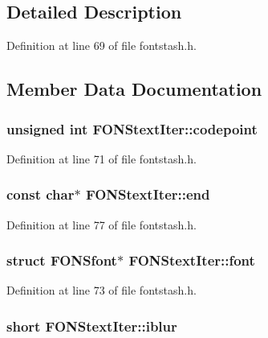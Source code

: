 \subsection{Detailed Description}


Definition at line 69 of file fontstash.\+h.



\subsection{Member Data Documentation}
\hypertarget{struct_f_o_n_stext_iter_aa5f74c11fa7741d0050e5a1840169ffd}{
\subsubsection[{codepoint}]{\setlength{\rightskip}{0pt plus 5cm}unsigned int F\+O\+N\+Stext\+Iter\+::codepoint}}\label{struct_f_o_n_stext_iter_aa5f74c11fa7741d0050e5a1840169ffd}


Definition at line 71 of file fontstash.\+h.

\hypertarget{struct_f_o_n_stext_iter_ad92484b2073e6000da97840175852013}{
\subsubsection[{end}]{\setlength{\rightskip}{0pt plus 5cm}const char$\ast$ F\+O\+N\+Stext\+Iter\+::end}}\label{struct_f_o_n_stext_iter_ad92484b2073e6000da97840175852013}


Definition at line 77 of file fontstash.\+h.

\hypertarget{struct_f_o_n_stext_iter_adca38e1f79a9b30af70f68f660b048a4}{
\subsubsection[{font}]{\setlength{\rightskip}{0pt plus 5cm}struct F\+O\+N\+Sfont$\ast$ F\+O\+N\+Stext\+Iter\+::font}}\label{struct_f_o_n_stext_iter_adca38e1f79a9b30af70f68f660b048a4}


Definition at line 73 of file fontstash.\+h.

\hypertarget{struct_f_o_n_stext_iter_ae337cf367c38b8ebb02b417e261f7142}{
\subsubsection[{iblur}]{\setlength{\rightskip}{0pt plus 5cm}short F\+O\+N\+Stext\+Iter\+::iblur}}\label{struct_f_o_n_stext_iter_ae337cf367c38b8ebb02b417e261f7142}


